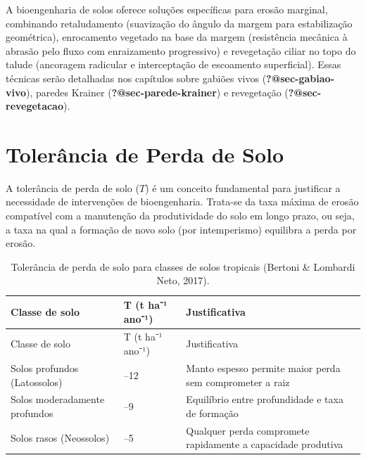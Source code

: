 \documentclass[
  portuguese,
  11pt,
  a4paper,
  open=any]{scrbook}
\begin{document}
A bioengenharia de solos oferece soluções específicas para erosão
marginal, combinando retaludamento (suavização do ângulo da margem para
estabilização geométrica), enrocamento vegetado na base da margem
(resistência mecânica à abrasão pelo fluxo com enraizamento progressivo)
e revegetação ciliar no topo do talude (ancoragem radicular e
interceptação de escoamento superficial). Essas técnicas serão
detalhadas nos capítulos sobre gabiões vivos
(\textbf{?@sec-gabiao-vivo}), paredes Krainer
(\textbf{?@sec-parede-krainer}) e revegetação
(\textbf{?@sec-revegetacao}).

\section{Tolerância de Perda de
Solo}\label{toleruxe2ncia-de-perda-de-solo}

A tolerância de perda de solo (\(T\)) é um conceito fundamental para
justificar a necessidade de intervenções de bioengenharia. Trata-se da
taxa máxima de erosão compatível com a manutenção da produtividade do
solo em longo prazo, ou seja, a taxa na qual a formação de novo solo
(por intemperismo) equilibra a perda por erosão.

\begin{longtable}[]{@{}
  >{\raggedright\arraybackslash}p{}
  >{\raggedright\arraybackslash}p{}
  >{\raggedright\arraybackslash}p{}@{}}
\caption{Tolerância de perda de solo para classes de solos tropicais
(Bertoni \& Lombardi Neto, 2017).}\label{tbl-tolerancia}\tabularnewline
\toprule\noalign{}
\begin{minipage}[b]{\linewidth}\raggedright
Classe de solo
\end{minipage} & \begin{minipage}[b]{\linewidth}\raggedright
T (t ha⁻¹ ano⁻¹)
\end{minipage} & \begin{minipage}[b]{\linewidth}\raggedright
Justificativa
\end{minipage} \\
\midrule\noalign{}
\endfirsthead
\toprule\noalign{}
\begin{minipage}[b]{\linewidth}\raggedright
Classe de solo
\end{minipage} & \begin{minipage}[b]{\linewidth}\raggedright
T (t ha⁻¹ ano⁻¹)
\end{minipage} & \begin{minipage}[b]{\linewidth}\raggedright
Justificativa
\end{minipage} \\
\midrule\noalign{}
\endhead
\bottomrule\noalign{}
\endlastfoot
Solos profundos (Latossolos) & 9--12 & Manto espesso permite maior perda
sem comprometer a raiz \\
Solos moderadamente profundos & 5--9 & Equilíbrio entre profundidade e
taxa de formação \\
Solos rasos (Neossolos) & 2--5 & Qualquer perda compromete rapidamente a
capacidade produtiva \\
\end{longtable}
\end{document}
